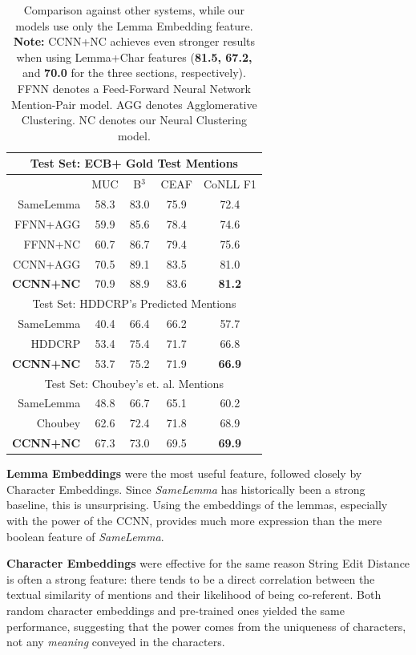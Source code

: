 \documentclass[11pt,a4paper]{article}
\begin{document}
\begin{table}[h]
\centering
\tabcolsep=0.11cm
\begin{tabular}{|r|ccc|c|}
 \hline
 \multicolumn{5}{|c|}{Test Set: ECB+ Gold Test Mentions} \\
 \hline
& MUC & B$^3$ & CEAF & CoNLL F1\\
 \hline
 SameLemma& 58.3 & 83.0 & 75.9 & 72.4\\
FFNN+AGG & 59.9 & 85.6 & 78.4 & 74.6 \\
FFNN+NC & 60.7 & 86.7 &  79.4 & 75.6 \\
CCNN+AGG & 70.5 & 89.1 & 83.5  & 81.0\\
\textbf{CCNN+NC}  & 70.9 & 88.9 & 83.6 & \textbf{81.2} \\
\hline
\hline
 \multicolumn{5}{|c|}{Test Set: HDDCRP's Predicted Mentions} \\
 \hline
 SameLemma& 40.4 & 66.4 & 66.2 & 57.7\\
 HDDCRP & 53.4 & 75.4 & 71.7  & 66.8\\
 \textbf{CCNN+NC} & 53.7 & 75.2 & 71.9  & \textbf{66.9}\\
 \hline
\hline
 \multicolumn{5}{|c|}{Test Set: Choubey's et. al. Mentions} \\
 \hline
 SameLemma& 48.8 & 66.7 & 65.1 & 60.2\\
 Choubey & 62.6 & 72.4 & 71.8  & 68.9\\
 \textbf{CCNN+NC} & 67.3 & 73.0 & 69.5  & \textbf{69.9}\\
 \hline
\end{tabular}
\caption{Comparison against other systems, while our models use only the Lemma Embedding feature.  \textbf{Note:} CCNN+NC achieves even stronger results when using Lemma+Char features (\textbf{81.5, 67.2,} and \textbf{70.0} for the three sections, respectively). FFNN denotes a Feed-Forward Neural Network Mention-Pair model.  AGG denotes Agglomerative Clustering.  NC denotes our Neural Clustering model.}
\label{tab:others}
\end{table}

\textbf{Lemma Embeddings} were the most useful feature, followed closely by Character Embeddings.  Since \textit{SameLemma} has historically been a strong baseline, this is unsurprising.  Using the embeddings of the lemmas, especially with the power of the CCNN, provides much more expression than the mere boolean feature of \textit{SameLemma}.

\textbf{Character Embeddings} were effective for the same reason String Edit Distance is often a strong feature: there tends to be a direct correlation between the textual similarity of mentions and their likelihood of being co-referent. Both random character embeddings and pre-trained ones yielded the same performance, suggesting that the power comes from the uniqueness of characters, not any \textit{meaning} conveyed in the characters.
\end{document}
